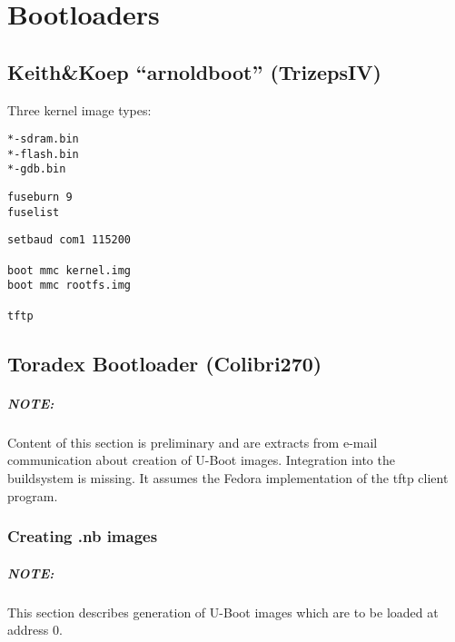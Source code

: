 \chapter{Bootloaders}

\section{Keith\&Koep ``arnoldboot'' (TrizepsIV)}

Three kernel image types:

\begin{description}
\item[\texttt{*-sdram.bin}]
\item[\texttt{*-flash.bin}]
\item[\texttt{*-gdb.bin}]
\end{description}

\begin{verbatim}
fuseburn 9
fuselist
\end{verbatim}



\begin{verbatim}
setbaud com1 115200

boot mmc kernel.img
boot mmc rootfs.img

tftp
\end{verbatim}

\section{Toradex Bootloader (Colibri270)}

\paragraph{NOTE:} Content of this section is preliminary and are
extracts from e-mail communication about creation of U-Boot images.
Integration into the buildsystem is missing.  It assumes the Fedora
implementation of the tftp client program.


\subsection{Creating .nb images}

\paragraph{NOTE:} This section describes generation of U-Boot images
which are to be loaded at address 0.


